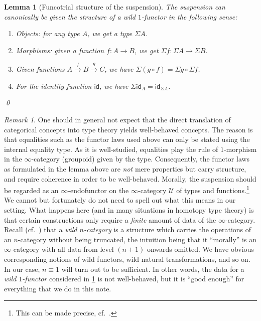 \documentclass[11pt,a4paper,oneside,reqno]{amsart}
\newtheorem{lemma}[theorem]{Lemma}
\theoremstyle{definition}
\theoremstyle{remark}
\newtheorem{remark}[theorem]{Remark}
\newcommand{\UU}{\mathcal{U}}
\newcommand{\idf}{\mathsf{id}}
\begin{document}
\begin{lemma}[Funcotrial structure of the suspension] \label{lem:Susp-is-functor}
 The suspension can canonically be given the structure of a \emph{wild $1$-functor} in the following sense:
 \begin{enumerate}
  \item \emph{Objects:} for any type $A$, we get a type $\Sigma A$.
  \item \emph{Morphisms:} given a function $f : A \to B$, we get $\Sigma f : \Sigma A \to \Sigma B$.
  \item Given functions $A \xrightarrow f B \xrightarrow g C$, we have $\Sigma(g \circ f) = \Sigma g \circ \Sigma f$.
  \item For the identity function $\idf$, we have $\Sigma \idf_A = \idf_{\Sigma A}$.
 \end{enumerate}
 \qed
\end{lemma}

\begin{remark} \label{rem:wildness}
One should in general not expect that the direct translation of categorical concepts into type theory yields well-behaved concepts.
The reason is that equalities such as the functor laws used above can only be stated using the internal equality type.
As it is well-studied, equalities play the rule of $1$-morphism in the $\infty$-category (groupoid) given by the type.
Consequently, the functor laws as formulated in the lemma above are \emph{not} mere properties but carry structure, and require coherence in order to be well-behaved.
Morally, the suspension should be regarded as an $\infty$-endofunctor on the $\infty$-category $\UU$ of types and functions.\footnote{This can be made precise, cf.\ \cite{ann-cap-kra:two-level}.}
We cannot but fortunately do not need to spell out what this means in our setting.
What happens here (and in many situations in homotopy type theory) is that certain constructions only require a \emph{finite} amount of data of the $\infty$-category.
Recall (cf.\ \cite{capKra_semisegal}) that a \emph{wild $n$-category} is a structure which carries the operations of an $n$-category without being truncated, the intuition being that it ``morally'' is an $\infty$-category with all data from level $(n+1)$ onwards omitted.
We have obvious corresponding notions of wild functors, wild natural transformations, and so on.
In our case, $n \equiv 1$ will turn out to be sufficient.
In other words, the data for a \emph{wild $1$-functor} considered in \cref{lem:Susp-is-functor} is not well-behaved, but it is ``good enough'' for everything that we do in this note.
\end{remark}
\end{document}
